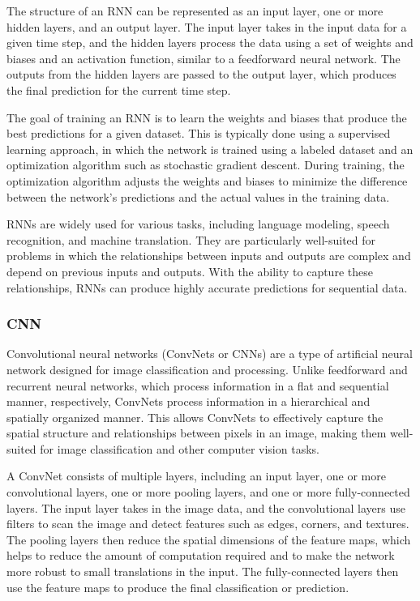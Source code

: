 \documentclass[12pt, a4paper, oneside]{article}
\begin{document}
The structure of an RNN can be represented as an input layer, one or more hidden layers, and an output layer. The input layer takes in the input data for a given time step, and the hidden layers process the data using a set of weights and biases and an activation function, similar to a feedforward neural network. The outputs from the hidden layers are passed to the output layer, which produces the final prediction for the current time step.

The goal of training an RNN is to learn the weights and biases that produce the best predictions for a given dataset. This is typically done using a supervised learning approach, in which the network is trained using a labeled dataset and an optimization algorithm such as stochastic gradient descent. During training, the optimization algorithm adjusts the weights and biases to minimize the difference between the network's predictions and the actual values in the training data.

RNNs are widely used for various tasks, including language modeling, speech recognition, and machine translation. They are particularly well-suited for problems in which the relationships between inputs and outputs are complex and depend on previous inputs and outputs. With the ability to capture these relationships, RNNs can produce highly accurate predictions for sequential data.
\subsubsection{CNN}
Convolutional neural networks (ConvNets or CNNs) are a type of artificial neural network designed for image classification and processing. Unlike feedforward and recurrent neural networks, which process information in a flat and sequential manner, respectively, ConvNets process information in a hierarchical and spatially organized manner. This allows ConvNets to effectively capture the spatial structure and relationships between pixels in an image, making them well-suited for image classification and other computer vision tasks.

A ConvNet consists of multiple layers, including an input layer, one or more convolutional layers, one or more pooling layers, and one or more fully-connected layers. The input layer takes in the image data, and the convolutional layers use filters to scan the image and detect features such as edges, corners, and textures. The pooling layers then reduce the spatial dimensions of the feature maps, which helps to reduce the amount of computation required and to make the network more robust to small translations in the input. The fully-connected layers then use the feature maps to produce the final classification or prediction.
\end{document}
